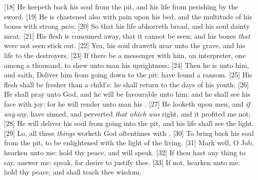 [18] \textcolor[cmyk]{0.99998,1,0,0}{He keepeth back his soul from the pit, and his life from perishing by the sword.}
[19] \textcolor[cmyk]{0.99998,1,0,0}{He is chastened also with pain upon his bed, and the multitude of his bones with strong \emph{pain}:}
[20] \textcolor[cmyk]{0.99998,1,0,0}{So that his life abhorreth bread, and his soul dainty meat.}
[21] \textcolor[cmyk]{0.99998,1,0,0}{His flesh is consumed away, that it cannot be seen; and his bones \emph{that} were not seen stick out.}
[22] \textcolor[cmyk]{0.99998,1,0,0}{Yea, his soul draweth near unto the grave, and his life to the destroyers.}
[23] \textcolor[cmyk]{0.99998,1,0,0}{If there be a messenger with him, an interpreter, one among a thousand, to shew unto man his uprightness:}
[24] \textcolor[cmyk]{0.99998,1,0,0}{Then he is  unto him, and saith, Deliver him from going down to the pit:   have found a ransom.}
[25] \textcolor[cmyk]{0.99998,1,0,0}{His flesh shall be fresher than a child's: he shall return to the days of his youth:}
[26] \textcolor[cmyk]{0.99998,1,0,0}{He shall pray unto God, and he will be favourable unto him: and he shall see his face with joy: for he will render unto man his .}
[27] \textcolor[cmyk]{0.99998,1,0,0}{He looketh upon men, and \emph{if} \emph{any} say,   have sinned, and perverted \emph{that} \emph{which} \emph{was} right, and it profited me not;}
[28] \textcolor[cmyk]{0.99998,1,0,0}{He will deliver his soul from going into the pit, and his life shall see the light.}
[29] \textcolor[cmyk]{0.99998,1,0,0}{Lo, all these \emph{things} worketh God oftentimes with ,}
[30] \textcolor[cmyk]{0.99998,1,0,0}{To bring back his soul from the pit, to be enlightened with the light of the living.}
[31] \textcolor[cmyk]{0.99998,1,0,0}{Mark well, O Job, hearken unto me: hold thy peace, and   will speak.}
[32] \textcolor[cmyk]{0.99998,1,0,0}{If thou hast any thing to say, answer me: speak, for   desire to justify thee.}
[33] \textcolor[cmyk]{0.99998,1,0,0}{If not, hearken unto me: hold thy peace, and   shall teach thee wisdom.}